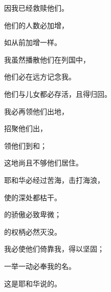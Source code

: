 {\par }{\Q 因我已经救赎他们。
\par }{\Q 他们的人数必加增，
\par }{\Q 如从前加增一样。
\par }{\Q {}我虽然播散他们在列国中，
\par }{\Q 他们必在远方记念我。
\par }{\Q 他们与儿女都必存活，且得归回。
\par }{\Q {}我必再领他们出{}地，
\par }{\Q 招聚他们出{}，
\par }{\Q 领他们到{}和{}；
\par }{\Q 这地尚且不够他们居住。
\par }{\Q {}耶和华必经过苦海，击打海浪，
\par }{\Q 使{}的深处都枯干。
\par }{的骄傲必致卑微；
\par }{的权柄必然灭没。
\par }{\Q {}我必使他们倚靠我，得以坚固；
\par }{\Q 一举一动必奉我的名。
\par }{\Q 这是耶和华说的。

}
